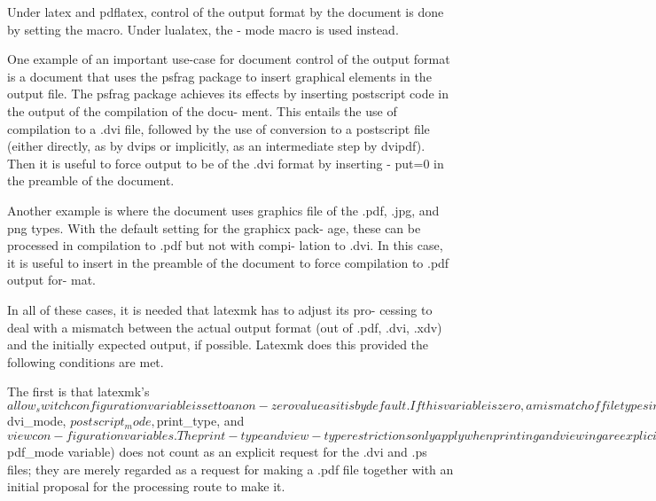        Under latex and pdflatex, control of the output format by the  document
       is  done by setting the \pdfoutput macro.  Under lualatex, the \output-
       mode macro is used instead.

       One example of an important use-case for document control of the output
       format  is  a document that uses the psfrag package to insert graphical
       elements in the output file. The psfrag package achieves its effects by
       inserting postscript code in the output of the compilation of the docu-
       ment.  This entails the use of compilation to a .dvi file, followed  by
       the  use  of  conversion  to  a postscript file (either directly, as by
       dvips or implicitly, as an intermediate step by dvipdf).   Then  it  is
       useful  to  force output to be of the .dvi format by inserting \pdfout-
       put=0 in the preamble of the document.

       Another example is where the document uses graphics file of  the  .pdf,
       .jpg,  and  png types.  With the default setting for the graphicx pack-
       age, these can be processed in compilation to .pdf but not with  compi-
       lation  to  .dvi.  In this case, it is useful to insert  in
       the preamble of the document to force compilation to .pdf  output  for-
       mat.

       In all of these cases, it is needed that latexmk has to adjust its pro-
       cessing to deal with a mismatch between the actual output  format  (out
       of  .pdf,  .dvi,  .xdv) and the initially expected output, if possible.
       Latexmk does this provided the following conditions are met.

       The first is that latexmk's $allow_switch configuration variable is set
       to  a  non-zero value as it is by default.  If this variable is zero, a
       mismatch of filetypes in the compilation results in an erro.




                                 17 April 2020                              25








       The second condition for latexmk to be able to handle a change of  out-
       put  type is that no explicit requests for .dvi or .ps output files are
       made.   Explicit  requests  are  by  the  -dvi  and  -ps,   -print=dvi,
       -print=ps,  -view=dvi,  and -view=ps options, and by corresponding set-
       tings of the $dvi_mode, $postscript_mode, $print_type, and  $view  con-
       figuration  variables.   The print-type and view-type restrictions only
       apply when printing and viewing are explicitly requested, respectively.
       For  this  purpose,  the use of the -pdfdvi and -pdfps options (and the
       corresponding setting of the $pdf_mode variable) does not count  as  an
       explicit  request  for the .dvi and .ps files; they are merely regarded
       as a request for making a .pdf file together with an  initial  proposal
       for the processing route to make it.

